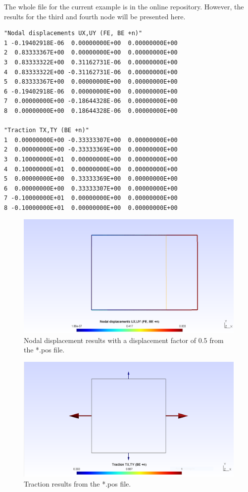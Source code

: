 \documentclass[A4]{article}
\begin{document}
The whole file for the current example is in the online repository. However, the results for the third and fourth node will be presented here. 

\begin{Verbatim}
"Nodal displacements UX,UY (FE, BE +n)"
1 -0.19402918E-06  0.00000000E+00  0.00000000E+00
2  0.83333367E+00  0.00000000E+00  0.00000000E+00
3  0.83333322E+00  0.31162731E-06  0.00000000E+00
4  0.83333322E+00 -0.31162731E-06  0.00000000E+00
5  0.83333367E+00  0.00000000E+00  0.00000000E+00
6 -0.19402918E-06  0.00000000E+00  0.00000000E+00
7  0.00000000E+00 -0.18644328E-06  0.00000000E+00
8  0.00000000E+00  0.18644328E-06  0.00000000E+00

"Traction TX,TY (BE +n)"
1  0.00000000E+00 -0.33333307E+00  0.00000000E+00
2  0.00000000E+00 -0.33333369E+00  0.00000000E+00
3  0.10000000E+01  0.00000000E+00  0.00000000E+00
4  0.10000000E+01  0.00000000E+00  0.00000000E+00
5  0.00000000E+00  0.33333369E+00  0.00000000E+00
6  0.00000000E+00  0.33333307E+00  0.00000000E+00
7 -0.10000000E+01  0.00000000E+00  0.00000000E+00
8 -0.10000000E+01  0.00000000E+00  0.00000000E+00
\end{Verbatim}

\begin{figure}[h]
	\centering
	\includegraphics[scale = 0.5]{displacement.png}
	\caption{Nodal displacement results with a displacement factor of 0.5 from the *.pos file.}
	\label{fig:displacement}
\end{figure}

\begin{figure}
	\centering
	\includegraphics[scale = 0.5]{traction.png}
	\caption{Traction results from the *.pos file.}
	\label{fig:traction}
\end{figure}
\end{document}
